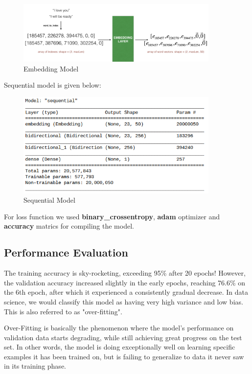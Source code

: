 \documentclass{article}
\begin{document}
\begin{figure}[h!]
    \centering
    \includegraphics[width=10cm]{embedding.png}
    \caption{Embedding Model}
    \label{fig:my_label}
\end{figure}

Sequential model is given below:

\begin{figure}[h!]
    \centering
    \includegraphics[width=10cm]{sequential.png}
    \caption{Sequential Model}
    \label{fig:sq_model}
\end{figure}

For loss function we used \textbf{binary\_crossentropy}, \textbf{adam} optimizer and \textbf{accuracy} matrics for compiling the model. 


\newpage
\subsection{Performance Evaluation}
The training accuracy is sky-rocketing, exceeding 95\% after 20 epochs! However, the validation accuracy increased slightly in the early epochs, reaching 76.6\% on the 6th epoch, after which it experienced a consistently gradual decrease. In data science, we would classify this model as having very high variance and low bias. This is also referred to as "over-fitting".

Over-Fitting is basically the phenomenon where the model's performance on validation data starts degrading, while still achieving great progress on the test set. In other words, the model is doing exceptionally well on learning specific examples it has been trained on, but is failing to generalize to data it never saw in its training phase.
\end{document}
